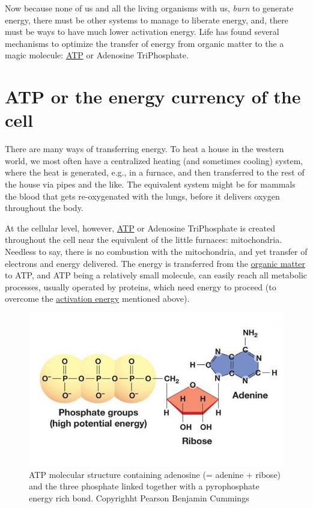 \documentclass[]{book}
\theoremstyle{definition}
\theoremstyle{definition}
\theoremstyle{definition}
\theoremstyle{remark}
\begin{document}
Now because none of us and all the living organisms with us, \emph{burn}
to generate energy, there must be other systems to manage to liberate
energy, and, there must be ways to have much lower activation energy.
Life has found several mechanisms to optimize the transfer of energy
from organic matter to the a magic molecule:
\protect\hyperlink{ATP}{ATP} or Adenosine TriPhosphate.

\section{ATP or the energy currency of the
cell}\label{atp-or-the-energy-currency-of-the-cell}

There are many ways of transferring energy. To heat a house in the
western world, we most often have a centralized heating (and sometimes
cooling) system, where the heat is generated, e.g., in a furnace, and
then transferred to the rest of the house via pipes and the like. The
equivalent system might be for mammals the blood that gets re-oxygenated
with the lungs, before it delivers oxygen throughout the body.

At the cellular level, however, \protect\hyperlink{ATP}{ATP} or
Adenosine TriPhosphate is created throughout the cell near the
equivalent of the little furnaces: mitochondria. Needless to say, there
is no combustion with the mitochondria, and yet transfer of electrons
and energy delivered. The energy is transferred from the
\protect\hyperlink{OM}{organic matter} to ATP, and ATP being a
relatively small molecule, can easily reach all metabolic processes,
usually operated by proteins, which need energy to proceed (to overcome
the \href{https://en.wikipedia.org/wiki/Activation_energy}{activation
energy} mentioned above).

\begin{figure}

{\centering \includegraphics[width=0.7\linewidth]{pictures/atp02a} 

}

\caption{ATP molecular structure containing adenosine (= adenine + ribose) and the three phosphate linked together with a pyrophosphate energy rich bond. Copyrighht Pearson Benjamin Cummings}\label{fig:ATPstructure}
\end{figure}
\end{document}
